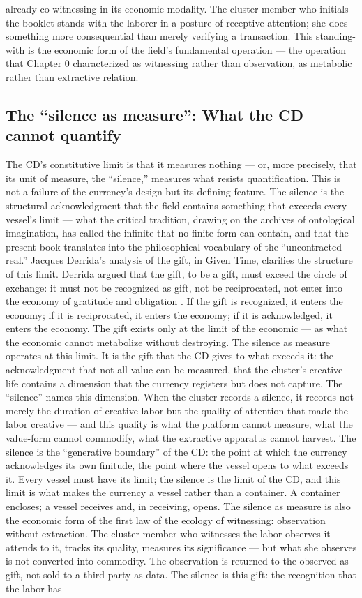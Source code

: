 already co-witnessing in its economic modality. The cluster member who initials the booklet stands with the laborer in a posture of receptive attention; she does something more consequential than merely verifying a transaction. This standing-with is the economic form of the field’s fundamental operation — the operation that Chapter 0 characterized as witnessing rather than observation, as metabolic rather than extractive relation.

\subsection{The “silence as measure”: What the CD cannot quantify}

The CD’s constitutive limit is that it measures nothing — or, more precisely, that its unit of measure, the “silence,” measures what resists quantification. This is not a failure of the currency’s design but its defining feature. The silence is the structural acknowledgment that the field contains something that exceeds every vessel’s limit — what the critical tradition, drawing on the archives of ontological imagination, has called the infinite that no finite form can contain, and that the present book translates into the philosophical vocabulary of the “uncontracted real.” Jacques Derrida’s analysis of the gift, in Given Time, clarifies the structure of this limit. Derrida argued that the gift, to be a gift, must exceed the circle of exchange: it must not be recognized as gift, not be reciprocated, not enter into the economy of gratitude and obligation \cite{derrida_1992}. If the gift is recognized, it enters the economy; if it is reciprocated, it enters the economy; if it is acknowledged, it enters the economy. The gift exists only at the limit of the economic — as what the economic cannot metabolize without destroying. The silence as measure operates at this limit. It is the gift that the CD gives to what exceeds it: the acknowledgment that not all value can be measured, that the cluster’s creative life contains a dimension that the currency registers but does not capture. The “silence” names this dimension. When the cluster records a silence, it records not merely the duration of creative labor but the quality of attention that made the labor creative — and this quality is what the platform cannot measure, what the value-form cannot commodify, what the extractive apparatus cannot harvest. The silence is the “generative boundary” of the CD: the point at which the currency acknowledges its own finitude, the point where the vessel opens to what exceeds it. Every vessel must have its limit; the silence is the limit of the CD, and this limit is what makes the currency a vessel rather than a container. A container encloses; a vessel receives and, in receiving, opens. The silence as measure is also the economic form of the first law of the ecology of witnessing: observation without extraction. The cluster member who witnesses the labor observes it — attends to it, tracks its quality, measures its significance — but what she observes is not converted into commodity. The observation is returned to the observed as gift, not sold to a third party as data. The silence is this gift: the recognition that the labor has 